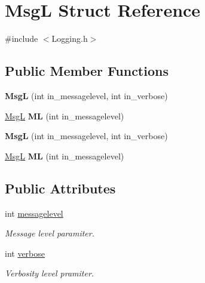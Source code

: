 \hypertarget{structMsgL}{\section{Msg\-L Struct Reference}
\label{structMsgL}
}


{\ttfamily \#include $<$Logging.\-h$>$}

\subsection*{Public Member Functions}
\begin{DoxyCompactItemize}
\item 
\hypertarget{structMsgL_a3db55b36647db334baef366d0be0730c}{{\bfseries Msg\-L} (int in\-\_\-messagelevel, int in\-\_\-verbose)}\label{structMsgL_a3db55b36647db334baef366d0be0730c}

\item 
\hypertarget{structMsgL_afcb7738a46b98d647fc81937af7d0a49}{\hyperlink{structMsgL}{Msg\-L} {\bfseries M\-L} (int in\-\_\-messagelevel)}\label{structMsgL_afcb7738a46b98d647fc81937af7d0a49}

\item 
\hypertarget{structMsgL_a3db55b36647db334baef366d0be0730c}{{\bfseries Msg\-L} (int in\-\_\-messagelevel, int in\-\_\-verbose)}\label{structMsgL_a3db55b36647db334baef366d0be0730c}

\item 
\hypertarget{structMsgL_afcb7738a46b98d647fc81937af7d0a49}{\hyperlink{structMsgL}{Msg\-L} {\bfseries M\-L} (int in\-\_\-messagelevel)}\label{structMsgL_afcb7738a46b98d647fc81937af7d0a49}

\end{DoxyCompactItemize}
\subsection*{Public Attributes}
\begin{DoxyCompactItemize}
\item 
\hypertarget{structMsgL_a5372c9de7067078f88eda46bcec43096}{int \hyperlink{structMsgL_a5372c9de7067078f88eda46bcec43096}{messagelevel}}\label{structMsgL_a5372c9de7067078f88eda46bcec43096}

\begin{DoxyCompactList}\small\item\em Message level paramiter. \end{DoxyCompactList}\item 
\hypertarget{structMsgL_a10337c60eff6573f6bf36dd6b6bfd4c6}{int \hyperlink{structMsgL_a10337c60eff6573f6bf36dd6b6bfd4c6}{verbose}}\label{structMsgL_a10337c60eff6573f6bf36dd6b6bfd4c6}

\begin{DoxyCompactList}\small\item\em Verbosity level pramiter. \end{DoxyCompactList}\end{DoxyCompactItemize}


